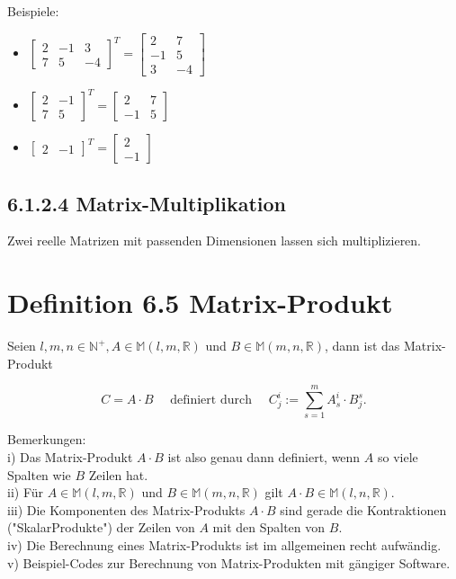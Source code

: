 \documentclass[10pt]{article}
\begin{document}
Beispiele:

\begin{itemize}
  \item $\left[\begin{array}{rrr}2 & -1 & 3 \\ 7 & 5 & -4\end{array}\right]^{T}=\left[\begin{array}{rr}2 & 7 \\ -1 & 5 \\ 3 & -4\end{array}\right]$
  \item $\left[\begin{array}{rr}2 & -1 \\ 7 & 5\end{array}\right]^{T}=\left[\begin{array}{rr}2 & 7 \\ -1 & 5\end{array}\right]$
  \item $\left[\begin{array}{ll}2 & -1\end{array}\right]^{T}=\left[\begin{array}{r}2 \\ -1\end{array}\right]$
\end{itemize}

\subsection*{6.1.2.4 Matrix-Multiplikation}
Zwei reelle Matrizen mit passenden Dimensionen lassen sich multiplizieren.

\section*{Definition 6.5 Matrix-Produkt}
Seien $l, m, n \in \mathbb{N}^{+}, A \in \mathbb{M}(l, m, \mathbb{R})$ und $B \in \mathbb{M}(m, n, \mathbb{R})$, dann ist das Matrix-Produkt


\begin{equation*}
C=A \cdot B \quad \text { definiert durch } \quad C_{j}^{i}:=\sum_{s=1}^{m} A_{s}^{i} \cdot B_{j}^{s} . \tag{6.11}
\end{equation*}


Bemerkungen:\\
i) Das Matrix-Produkt $A \cdot B$ ist also genau dann definiert, wenn $A$ so viele Spalten wie $B$ Zeilen hat.\\
ii) Für $A \in \mathbb{M}(l, m, \mathbb{R})$ und $B \in \mathbb{M}(m, n, \mathbb{R})$ gilt $A \cdot B \in \mathbb{M}(l, n, \mathbb{R})$.\\
iii) Die Komponenten des Matrix-Produkts $A \cdot B$ sind gerade die Kontraktionen ("SkalarProdukte") der Zeilen von $A$ mit den Spalten von $B$.\\
iv) Die Berechnung eines Matrix-Produkts ist im allgemeinen recht aufwändig.\\
v) Beispiel-Codes zur Berechnung von Matrix-Produkten mit gängiger Software.
\end{document}
